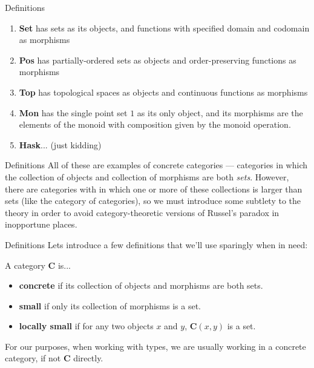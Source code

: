 \documentclass[tikz]{beamer}
\theoremstyle{definition}
\begin{document}
\begin{frame}{Definitions}
\begin{enumerate}[i]
    \item \textbf{Set} has sets as its objects, and functions with specified domain and codomain as morphisms
    \item \textbf{Pos} has partially-ordered sets as objects and order-preserving functions as morphisms
    \item \textbf{Top} has topological spaces as objects and continuous functions as morphisms
    \item \textbf{Mon} has the single point set $1$ as its only object, and its morphisms are the elements of the monoid with composition given by the monoid operation.
    \item \textbf{Hask}... (just kidding)
\end{enumerate}{}
\end{frame}
\begin{frame}{Definitions}
    All of these are examples of concrete categories --- categories in which the collection of objects and collection of morphisms are both \textit{sets}. However, there are categories with in which one or more of these collections is larger than sets (like the category of categories), so we must introduce some subtlety to the theory in order to avoid category-theoretic versions of Russel's paradox in inopportune places.
\end{frame}{}
\begin{frame}{Definitions}
    Lets introduce a few definitions that we'll use sparingly when in need:

\begin{definition}

A category $\mathbf{C}$ is...
\begin{itemize}
    \item \textbf{concrete} if its collection of objects and morphisms are both sets.
    \item  \textbf{small} if only its collection of morphisms is a set.
    \item \textbf{locally small} if for any two objects $x$ and $y$, $\mathbf{C}(x, y)$  is a set.
\end{itemize}
\end{definition}

For our purposes, when working with types, we are usually working in a concrete category, if not $\mathbf{C}$ directly.
\end{frame}
\end{document}
